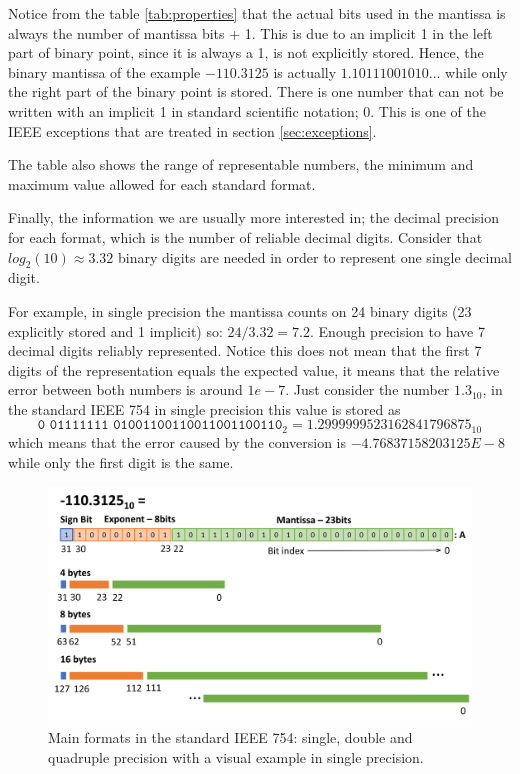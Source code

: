 Notice from the table \ref{tab:properties} that the actual bits used in the mantissa is always the number of mantissa bits + 1. 
This is due to an implicit 1 in the left part of binary point, since it is always a 1, is not explicitly stored. 
Hence, the binary mantissa of the example $-110.3125$ is actually $1.10111001010...$ while only the right part of the binary point is stored.
There is one number that can not be written with an implicit 1 in standard scientific notation; 0. 
This is one of the IEEE exceptions that are treated in section \ref{sec:exceptions}. 

The table also shows the range of representable numbers, the minimum and maximum value allowed for each standard format. 

Finally, the information we are usually more interested in; the decimal precision for each format, which is the number of reliable decimal digits. Consider that $log_2(10)\approx 3.32 $ binary digits are needed in order to represent one single decimal digit. 

For example, in single precision the mantissa counts on 24 binary digits (23 explicitly stored and 1 implicit) so: $24/3.32 = 7.2$. 
Enough precision to have 7 decimal digits reliably represented. 
Notice this does not mean that the first 7 digits of the representation equals the expected value, it means that the relative error between both numbers is around $1e-7$. 
Just consider the number $1.3_{10}$, in the standard IEEE 754 in single precision this value is stored as 
$$
\texttt{0 01111111 01001100110011001100110}_2 = 1.2999999523162841796875_{10}
$$
which means that the error caused by the conversion is $-4.76837158203125E-8$ while only the first digit is the same.

\newpage
\begin{figure}
    \centering
    \includegraphics[width= \textwidth]{./doc/Figures/ParametersIEEE.png}
    \caption{Main formats in the standard IEEE 754: single, double and quadruple precision with a visual example in single precision.}
    \label{fig:ParametersIEEE}
\end{figure}


